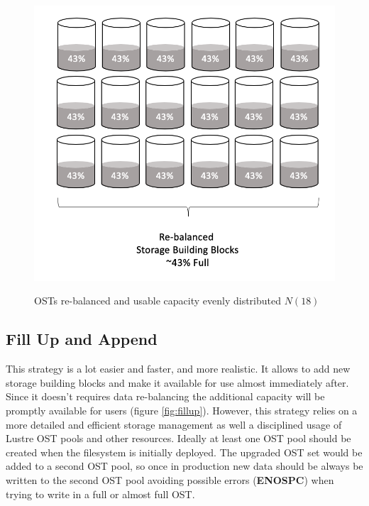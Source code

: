 \documentclass{article}
\begin{document}
\begin{figure}[ht]
    \centering
    \includegraphics[scale=0.37]{OSTs-rebalanced.png}\\[0.5cm]
    \caption{OSTs re-balanced and usable capacity evenly distributed $N(18)$}
    \label{fig:re-balanced OSTs}
\end{figure}


\subsection{Fill Up and Append}
This strategy is a lot easier and faster, and more realistic. It allows to add new storage building blocks and make it available for use almost immediately after. Since it doesn't requires data re-balancing the additional capacity will be promptly available for users (figure \ref{fig:fillup}). However, this strategy relies on a more detailed and efficient storage management as well a  disciplined usage of Lustre OST pools and other resources. 
Ideally at least one OST pool should be created when the filesystem is initially deployed. The upgraded OST set would be added to a second OST pool, so once in production new data should be always be written to the second OST pool avoiding possible errors (\textbf{ENOSPC}) when trying to write in a full or almost full OST. 
\end{document}
